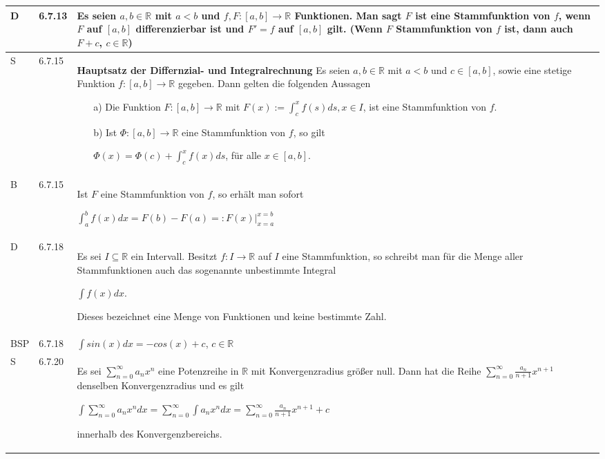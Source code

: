     \begin{longtable}{p{0.75cm} p{1cm} p{16cm}}
        \toprule

        D   & 6.7.13&   Es seien $a,b \in \mathbb{R}$ mit $a<b$ und $f, F: [a,b] \rightarrow \mathbb{R}$ Funktionen. Man sagt $F$ ist eine
                        \textbf{Stammfunktion} von $f$, wenn $F$ auf $[a,b]$ differenzierbar ist und $F' = f$ auf $[a,b]$ gilt. \hfill \break
                        (Wenn $F$ Stammfunktion von $f$ ist, dann auch $F + c$, $c \in \mathbb{R}$) \\
        \midrule
        S   & 6.7.15&   \textbf{Hauptsatz der Differnzial- und Integralrechnung} \hfill \break
                        Es seien $a,b \in \mathbb{R}$ mit $a < b$ und $c \in [a,b]$, sowie eine stetige Funktion $f: [a,b] \rightarrow \mathbb{R}$
                        gegeben. Dann gelten die folgenden Aussagen 
                        \begin{itemize}[topsep=-0.5cm]
                            \item[a)] Die Funktion $F: [a,b] \rightarrow \mathbb{R}$ mit $F(x) := \int_c^xf(s) ds, x\in I$, ist eine Stammfunktion
                                        von $f$.
                            \item[b)] Ist $\Phi : [a,b] \rightarrow \mathbb{R}$ eine Stammfunktion von $f$, so gilt \hfill \break
                                        \centerline{$ \Phi(x) = \Phi(c) + \int_c^x f(x) ds$, für alle $x\in[a,b]$.}
                        \end{itemize} \vspace{-0cm} \\
        \midrule
        B   & 6.7.15&   Ist $F$ eine Stammfunktion von $f$, so erhält man sofort \hfill \break
                        \centerline{$ \int_a^bf(x) dx = F(b)-F(a) =: F(x) \vert^{x=b}_{x=a} $} \\
        \midrule
        D   & 6.7.18&   Es sei $I \subseteq \mathbb{R}$ ein Intervall. Besitzt $f: I \rightarrow \mathbb{R}$ auf $I$ eine Stammfunktion, so schreibt
                        man für die Menge aller Stammfunktionen auch das sogenannte unbestimmte Integral \hfill \break
                        \centerline{$ \int f(x) dx $.}
                        Dieses bezeichnet eine Menge von Funktionen und keine bestimmte Zahl. \\
        \midrule
        BSP & 6.7.18&   $\int sin(x) dx = -cos(x) + c$, $c \in \mathbb{R}$ \\
        \midrule
        S   & 6.7.20&   Es sei $\sum^{\infty}_{n=0} a_n x^n$ eine Potenzreihe in $\mathbb{R}$ mit Konvergenzradius größer null. Dann hat die Reihe
                        $\sum^{\infty}_{n=0} \frac{a_n}{n+1}x^{n+1}$ denselben Konvergenzradius und es gilt \hfill \break
                        \centerline{$ \int \sum^{\infty}_{n=0} a_n x^n dx = \sum^{\infty}_{n=0} \int a_n x^n dx = \sum^{\infty}_{n=0} 
                        \frac{a_n}{n+1}x^{n+1}+c $} innerhalb des Konvergenzbereichs. \\
        \bottomrule

    \end{longtable}

